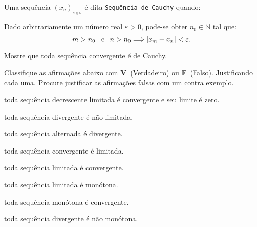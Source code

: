 \documentclass{ativmatUFRB}
\begin{document}
\begin{atividade}
\questao Uma sequência $(x_n)_{_{n\in\mathbb{N}}}$ é dita \texttt{Sequência de
Cauchy} quando:
\begin{center}
 \fbox
 {
  \begin{minipage}{.7\textwidth}
   Dado arbitrariamente um número real $\displaystyle \varepsilon > 0$, pode-se 
   obter $\displaystyle n_{0}\in \mathbb{N}$ tal que:
   \[
    m > n_{0} \hspace{0.5em} \textrm{ e } \hspace{0.5em} n > n_{0} 
    \Longrightarrow
    \left|x_{m} - x_{n}\right| < \varepsilon.
   \]
  \end{minipage}
 }
\end{center}
\begin{itens}
 \item Mostre que toda sequência convergente é de Cauchy.
\end{itens}

\questao Classifique as afirmações abaixo com \textbf{V}~(Verdadeiro) ou 
\textbf{F}~(Falso). Justificando cada uma. Procure justificar as afirmações 
falsas com um contra exemplo.
\begin{multicols}{2} %
 \begin{itens}[\vf] %
  \item toda sequência decrescente limitada é convergente e seu limite é zero.
  \item toda sequência divergente é não limitada.
  \item toda sequência alternada é divergente.
  \item toda sequência convergente é limitada.
  \item toda sequência limitada é convergente.
  \item toda sequência limitada é monótona.
  \item toda sequência monótona é convergente.
  \item toda sequência divergente é não monótona. 
 \end{itens}
\end{multicols}


\end{atividade}
\end{document}
